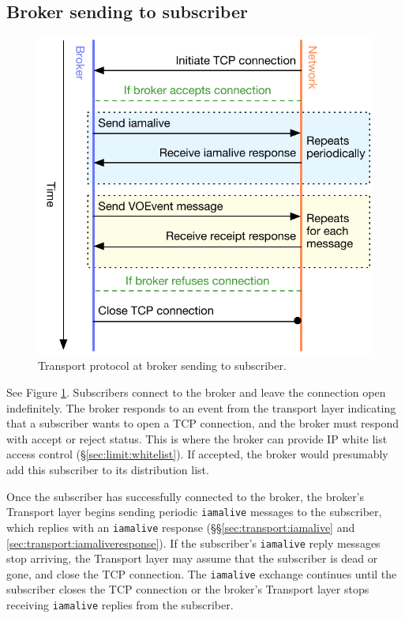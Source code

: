 \documentclass[a4paper,11pt]{ivoa}
\begin{document}
\subsection{Broker sending to subscriber}

\begin{figure}[H]
  \begin{center}
  \includegraphics{figures/brokertosub.pdf}
  \end{center}

  \caption{Transport protocol at broker sending to subscriber.}

  \label{fig:protocol:brokertosub}
\end{figure}

See Figure \ref{fig:protocol:brokertosub}. Subscribers connect to the broker
and leave the connection open indefinitely. The broker responds to an event
from the transport layer indicating that a subscriber wants to open a TCP
connection, and the broker must respond with accept or reject status. This is
where the broker can provide IP white list access control
(\S\ref{sec:limit:whitelist}). If accepted, the broker would presumably add
this subscriber to its distribution list.

Once the subscriber has successfully connected to the broker, the broker's
Transport layer begins sending periodic \texttt{iamalive} messages to the
subscriber, which replies with an \texttt{iamalive} response
(\S\S\ref{sec:transport:iamalive} and \ref{sec:transport:iamaliveresponse}).
If the subscriber's \texttt{iamalive} reply messages stop arriving, the
Transport layer may assume that the subscriber is dead or gone, and close the
TCP connection. The \texttt{iamalive} exchange continues until the subscriber
closes the TCP connection or the broker's Transport layer stops receiving
\texttt{iamalive} replies from the subscriber.
\end{document}
